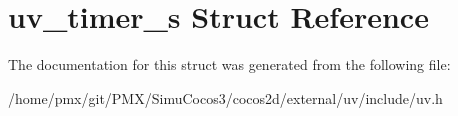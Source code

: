 \hypertarget{structuv__timer__s}{}\section{uv\+\_\+timer\+\_\+s Struct Reference}
\label{structuv__timer__s}


The documentation for this struct was generated from the following file\+:\begin{DoxyCompactItemize}
\item 
/home/pmx/git/\+P\+M\+X/\+Simu\+Cocos3/cocos2d/external/uv/include/uv.\+h\end{DoxyCompactItemize}
